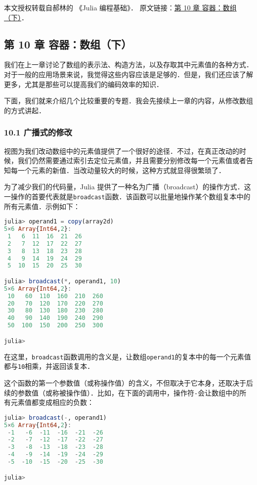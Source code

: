 
本文授权转载自郝林的 《Julia 编程基础》． 原文链接：\href{https://github.com/hyper0x/JuliaBasics/blob/master/book/ch10.md}{第 10 章 容器：数组（下）}．


\subsection{第 10 章 容器：数组（下）}

我们在上一章讨论了数组的表示法、构造方法，以及存取其中元素值的各种方式．对于一般的应用场景来说，我觉得这些内容应该是足够的．但是，我们还应该了解更多，尤其是那些可以提高我们的编码效率的知识．

下面，我们就来介绍几个比较重要的专题．我会先接续上一章的内容，从修改数组的方式讲起．

\subsubsection{10.1 广播式的修改}

视图为我们改动数组中的元素值提供了一个很好的途径．不过，在真正改动的时候，我们仍然需要通过索引去定位元素值，并且需要分别修改每一个元素值或者告知每一个元素的新值．当改动量较大的时候，这种方式就显得很繁琐了．

为了减少我们的代码量，Julia 提供了一种名为广播（broadcast）的操作方式．这一操作的首要代表就是\verb|broadcast|函数．该函数可以批量地操作某个数组复本中的所有元素值．示例如下：

\begin{lstlisting}[language=julia]
julia> operand1 = copy(array2d)
5×6 Array{Int64,2}:
 1   6  11  16  21  26
 2   7  12  17  22  27
 3   8  13  18  23  28
 4   9  14  19  24  29
 5  10  15  20  25  30

julia> broadcast(*, operand1, 10)
5×6 Array{Int64,2}:
 10   60  110  160  210  260
 20   70  120  170  220  270
 30   80  130  180  230  280
 40   90  140  190  240  290
 50  100  150  200  250  300

julia> 
\end{lstlisting}

在这里，\verb|broadcast|函数调用的含义是，让数组\verb|operand1|的复本中的每一个元素值都与\verb|10|相乘，并返回该复本．

这个函数的第一个参数值（或称操作值）的含义，不但取决于它本身，还取决于后续的参数值（或称被操作值）．比如，在下面的调用中，操作符\verb|-|会让数组中的所有元素值都变成相应的负数：

\begin{lstlisting}[language=julia]
julia> broadcast(-, operand1)
5×6 Array{Int64,2}:
 -1   -6  -11  -16  -21  -26
 -2   -7  -12  -17  -22  -27
 -3   -8  -13  -18  -23  -28
 -4   -9  -14  -19  -24  -29
 -5  -10  -15  -20  -25  -30

julia> 
\end{lstlisting}

